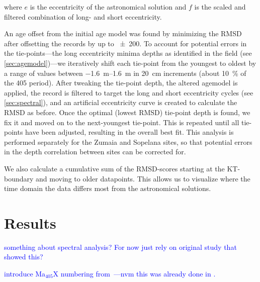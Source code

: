 \documentclass[draft]{agujournal2019}
\newcommand{\ijk}{\textcolor{blue}}
\begin{document}
where \(e\) is the eccentricity of the astronomical solution and \(f\) is the scaled and filtered combination of long- and short eccentricity.


An age offset from the initial age model was found by minimizing the \gls{RMSD} after offsetting the records by up to \qty{\pm200}{\kiloyear}.
To account for potential errors in the tie-points---the long eccentricity minima depths as identified in the field (see \cref{sec:agemodel})---we iteratively shift each tie-point from the youngest to oldest by a range of values between \qtyrange[range-phrase=~to~]{-1.6}{1.6}{\metre} in \qty{20}{\centi\metre} increments (about \qty{10}{\percent} of the \qty{405}{\kiloyear} period).
After tweaking the tie-point depth, the altered agemodel is applied, the record is filtered to target the long and short eccentricity cycles (see \cref{sec:spectral}), and an artificial eccentricity curve is created to calculate the \gls{RMSD} as before.
Once the optimal (lowest \gls{RMSD}) tie-point depth is found, we fix it and moved on to the next-youngest tie-point.
This is repeated until all tie-points have been adjusted, resulting in the overall best fit.
This analysis is performed separately for the Zumaia and Sopelana sites, so that potential errors in the depth correlation between sites can be corrected for.

We also calculate a cumulative sum of the \gls{RMSD}-scores starting at the \gls{KT}-boundary and moving to older datapoints.
This allows us to visualize where the time domain the data differs most from the astronomical solutions.

\section{Results}\label{sec:results}

\ijk{something about spectral analysis? For now just rely on original study that showed this?}

\ijk{introduce Ma\(_{405}\)X numbering from~\cite{Husson2011}---nvm this was already done in .}
\end{document}
